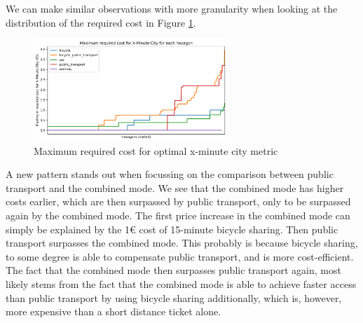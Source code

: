 We can make similar observations with more granularity when looking at the distribution of the required cost in Figure \ref{fig:maximum_required_cost_for_x_minute_city}.
\begin{figure}
  \begin{center}
    \includegraphics[width=0.65\textwidth]{Figures/results/cost/maximum_required_cost_for_x_minute_city}
  \end{center}
  \caption{Maximum required cost for optimal x-minute city metric}
  \label{fig:maximum_required_cost_for_x_minute_city}
\end{figure}
A new pattern stands out when focussing on the comparison between public transport and the combined mode.
We see that the combined mode has higher costs earlier, which are then surpassed by public transport, only to be surpassed again by the combined mode.
The first price increase in the combined mode can simply be explained by the 1€ cost of 15-minute bicycle sharing.
Then public transport surpasses the combined mode. 
This probably is because bicycle sharing, to some degree is able to compensate public transport, and is more cost-efficient.
The fact that the combined mode then surpasses public transport again, most likely stems from the fact that the combined mode is able to achieve faster access than public transport by using bicycle sharing additionally, which is, however, more expensive than a short distance ticket alone.

